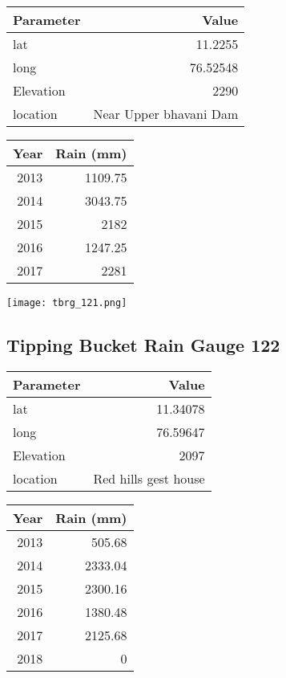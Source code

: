 \documentclass[a4paper]{article}
\begin{document}
\begin{center}
\begin{tabular}{lr}
Parameter & Value\\
\hline
lat & 11.2255\\
long & 76.52548\\
Elevation & 2290\\
location & Near Upper bhavani Dam\\
\end{tabular}
\end{center}

\begin{center}
\begin{tabular}{rr}
Year & Rain (mm)\\
\hline
2013 & 1109.75\\
2014 & 3043.75\\
2015 & 2182\\
2016 & 1247.25\\
2017 & 2281\\
\end{tabular}
\end{center}

\begin{center}
\texttt{[image: tbrg\_121.png]}
\end{center}

\newpage

\subsection*{Tipping Bucket Rain Gauge 122}
\label{sec:org5a4416c}

\begin{center}
\begin{tabular}{lr}
Parameter & Value\\
\hline
lat & 11.34078\\
long & 76.59647\\
Elevation & 2097\\
location & Red hills gest house\\
\end{tabular}
\end{center}

\begin{center}
\begin{tabular}{rr}
Year & Rain (mm)\\
\hline
2013 & 505.68\\
2014 & 2333.04\\
2015 & 2300.16\\
2016 & 1380.48\\
2017 & 2125.68\\
2018 & 0\\
\end{tabular}
\end{center}
\end{document}
